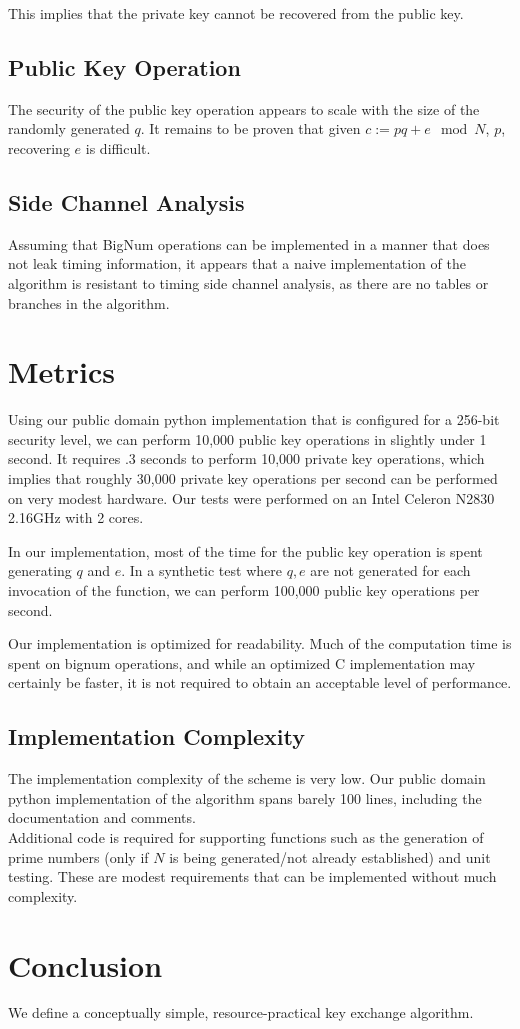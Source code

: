 \documentclass[preprint]{iacrtrans}
\begin{document}
This implies that the private key cannot be recovered from the public key.

\subsection{Public Key Operation}
The security of the public key operation appears to scale with the size of the randomly generated $q$. It remains to be proven that given $c := p q + e \mod N$, $p$, recovering $e$ is difficult.

\subsection{Side Channel Analysis}
Assuming that BigNum operations can be implemented in a manner that does not leak timing information, it appears that a naive implementation of the algorithm is resistant to timing side channel analysis, as there are no tables or branches in the algorithm.

\section{Metrics}
Using our public domain python implementation that is configured for a 256-bit security level, we can perform 10,000 public key operations in slightly under 1 second. It requires .3 seconds to perform 10,000 private key operations, which implies that roughly 30,000 private key operations per second can be performed on very modest hardware. Our tests were performed on an Intel Celeron N2830 2.16GHz with 2 cores. 

In our implementation, most of the time for the public key operation is spent generating $q$ and $e$. In a synthetic test where $q, e$ are not generated for each invocation of the function, we can perform 100,000 public key operations per second.

Our implementation is optimized for readability. Much of the computation time is spent on bignum operations, and while an optimized C implementation may certainly be faster, it is not required to obtain an acceptable level of performance. 

\subsection{Implementation Complexity}
The implementation complexity of the scheme is very low. Our public domain python implementation of the algorithm spans barely 100 lines, including the documentation and comments.\\

Additional code is required for supporting functions such as the generation of prime numbers (only if $N$ is being generated/not already established) and unit testing. These are modest requirements that can be implemented without much complexity. \\

\section{Conclusion}
We define a conceptually simple, resource-practical key exchange algorithm. 
\end{document}
